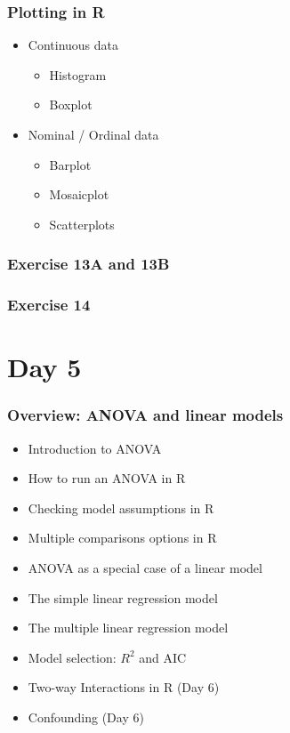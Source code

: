 \documentclass{beamer}\usepackage[]{graphicx}\usepackage[]{color}
\begin{document}
{{{
\begin{frame}[fragile]
\frametitle{Plotting in R}
\pause
\begin{itemize}
\setlength\itemsep{1.5em}
\item Continuous data
\begin{itemize}
\item Histogram
\item Boxplot
\end{itemize}
\item Nominal / Ordinal data
\begin{itemize}
\item Barplot
\item Mosaicplot
\item Scatterplots
\end{itemize}
\end{itemize}
\end{frame}


\begin{frame}
\frametitle{Exercise 13A and 13B}
\end{frame}

\begin{frame}
\frametitle{Exercise 14}
\end{frame}

\section{Day 5}
\usebackgroundtemplate{}
\begin{frame}
\frametitle{Overview: ANOVA and linear models}
\begin{itemize}
\item Introduction to ANOVA
\item How to run an ANOVA in R
\item Checking model assumptions in R
\item Multiple comparisons options in R
\item ANOVA as a special case of a linear model
\item The simple linear regression model
\item The multiple linear regression model
\item Model selection: $R^2$ and AIC
\item Two-way Interactions in R (Day 6)
\item Confounding (Day 6)


\end{itemize}
\end{frame}}}}
\end{document}
